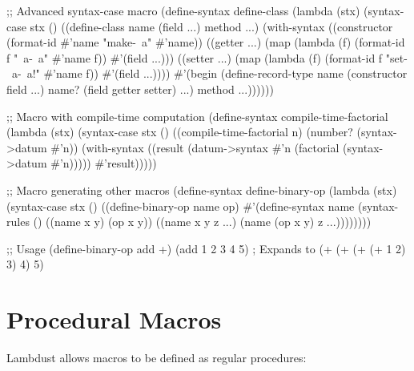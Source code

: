 \begin{example}
\begin{lambdustcode}
;; Advanced syntax-case macro
(define-syntax define-class
  (lambda (stx)
    (syntax-case stx ()
      ((define-class name (field ...) method ...)
       (with-syntax ((constructor (format-id #'name "make-~a" #'name))
                    ((getter ...) (map (lambda (f) 
                                        (format-id f "~a-~a" #'name f))
                                      #'(field ...)))
                    ((setter ...) (map (lambda (f)
                                        (format-id f "set-~a-~a!" #'name f))  
                                      #'(field ...))))
         #'(begin
             (define-record-type name
               (constructor field ...)
               name?
               (field getter setter) ...)
             method ...))))))

;; Macro with compile-time computation  
(define-syntax compile-time-factorial
  (lambda (stx)
    (syntax-case stx ()
      ((compile-time-factorial n)
       (number? (syntax->datum #'n))
       (with-syntax ((result (datum->syntax #'n 
                               (factorial (syntax->datum #'n)))))
         #'result)))))

;; Macro generating other macros
(define-syntax define-binary-op
  (lambda (stx)
    (syntax-case stx ()
      ((define-binary-op name op)
       #'(define-syntax name
           (syntax-rules ()
             ((name x y) (op x y))
             ((name x y z ...) (name (op x y) z ...))))))))

;; Usage
(define-binary-op add +)
(add 1 2 3 4 5)  ; Expands to (+ (+ (+ (+ 1 2) 3) 4) 5)
\end{lambdustcode}
\end{example}

\section{Procedural Macros}
\label{sec:procedural-macros}


Lambdust allows macros to be defined as regular procedures:

